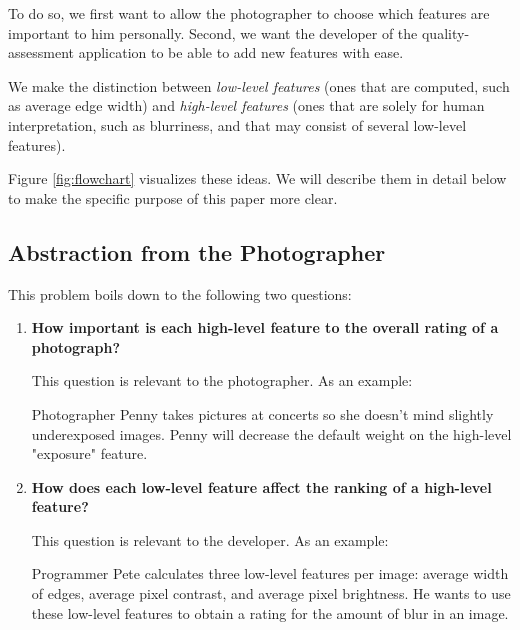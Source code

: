 \documentclass[10pt,twocolumn]{article}
\begin{document}
To do so, we first want to allow the photographer to choose which features are important to him personally.
Second, we want the developer of the quality-assessment application to be able to add new features with ease.

We make the distinction between \textit{low-level features} (ones that are computed, such as average edge width) and \textit{high-level features} (ones that are solely for human interpretation, such as blurriness, and that may consist of several low-level features). 

Figure \ref{fig:flowchart} visualizes these ideas. We will describe them in detail below to make the specific purpose of this paper more clear.

\begin{figure*}[t!]
  \caption{An example flowchart. Here, the application computes three low-level features. All three influence the two high-level features: blurriness and exposure. The developer controls which features are present. The photographer decides how to weight each high-level feature.}
  \label{fig:flowchart}
\end{figure*}

\subsection{Abstraction from the Photographer}
\label{abstraction}
This problem boils down to the following two questions:

\begin{enumerate}
\cite{twoquestions}
\item \textbf{How important is each high-level feature to the overall rating of a photograph?}

This question is relevant to the photographer. As an example:

Photographer Penny takes pictures at concerts so she doesn't mind slightly underexposed images. Penny will decrease the default weight on the high-level "exposure" feature.

\item \textbf{How does each low-level feature affect the ranking of a high-level feature?}

This  question is relevant to the developer. As an example:

Programmer Pete calculates three low-level features per image: average width of edges, average pixel contrast, and average pixel brightness. He wants to use these low-level features to obtain a rating for the amount of blur in an image.
\end{enumerate}
\end{document}
